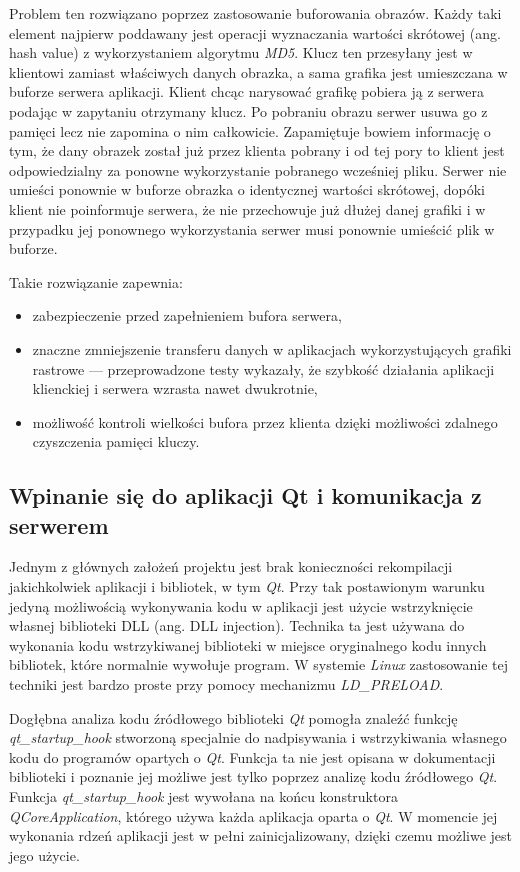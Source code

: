 Problem ten rozwiązano poprzez zastosowanie buforowania obrazów. Każdy taki element najpierw poddawany jest operacji wyznaczania wartości skrótowej (ang. hash value) z wykorzystaniem algorytmu \emph{MD5}. Klucz ten przesyłany jest w klientowi zamiast właściwych danych obrazka, a sama grafika jest umieszczana w buforze serwera aplikacji. Klient chcąc narysować grafikę pobiera ją z serwera podając w zapytaniu otrzymany klucz. Po pobraniu obrazu serwer usuwa go z pamięci lecz nie zapomina o nim całkowicie. Zapamiętuje bowiem informację o tym, że dany obrazek został już przez klienta pobrany i od tej pory to klient jest odpowiedzialny za ponowne wykorzystanie pobranego wcześniej pliku. Serwer nie umieści ponownie w buforze obrazka o identycznej wartości skrótowej, dopóki klient nie poinformuje serwera, że nie przechowuje już dłużej danej grafiki i w przypadku jej ponownego wykorzystania serwer musi ponownie umieścić plik w buforze. 

Takie rozwiązanie zapewnia:
\begin{itemize}
\item zabezpieczenie przed zapełnieniem bufora serwera,
\item znaczne zmniejszenie transferu danych w aplikacjach wykorzystujących grafiki rastrowe --- przeprowadzone testy wykazały, że szybkość działania aplikacji klienckiej i serwera wzrasta nawet dwukrotnie,
\item możliwość kontroli wielkości bufora przez klienta dzięki możliwości zdalnego czyszczenia pamięci kluczy.
\end{itemize}

\subsection{Wpinanie się do aplikacji Qt i komunikacja z serwerem} \label{sec:ldpreload}
Jednym z głównych założeń projektu jest brak konieczności rekompilacji jakichkolwiek aplikacji i bibliotek, w tym \emph{Qt}. Przy tak postawionym warunku jedyną możliwością wykonywania kodu w aplikacji jest użycie wstrzyknięcie własnej biblioteki DLL (ang. DLL injection). Technika ta jest używana do wykonania kodu wstrzykiwanej biblioteki w miejsce oryginalnego kodu innych bibliotek, które normalnie wywołuje program. W systemie \emph{Linux} zastosowanie tej techniki jest bardzo proste przy pomocy mechanizmu \emph{LD\_PRELOAD}\cite{ld}.

Dogłębna analiza kodu źródłowego biblioteki \emph{Qt} pomogła znaleźć funkcję \emph{qt\_startup\_hook} stworzoną specjalnie do nadpisywania i  wstrzykiwania własnego kodu do programów opartych o \emph{Qt}.
Funkcja ta nie jest opisana w dokumentacji biblioteki i poznanie jej możliwe jest tylko poprzez analizę kodu źródłowego \emph{Qt}. Funkcja \emph{qt\_startup\_hook} jest wywołana na końcu konstruktora \emph{QCoreApplication}, którego używa każda aplikacja oparta o \emph{Qt}. W momencie jej wykonania rdzeń aplikacji jest w pełni zainicjalizowany, dzięki czemu możliwe jest jego użycie.

